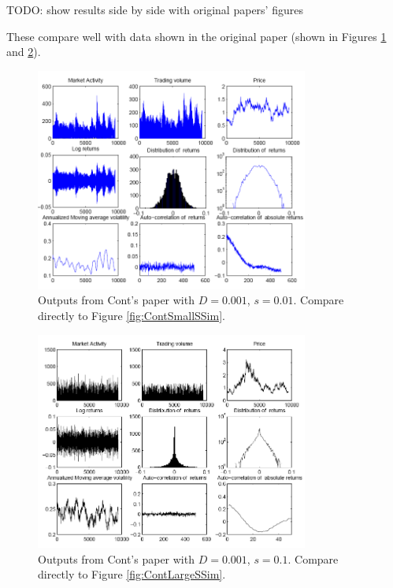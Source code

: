 \documentclass[runningheads]{llncs}
\begin{document}
TODO: show results side by side with original papers' figures

These compare well with data shown in the original paper (shown in Figures \ref{fig:ContSmallSPap} and \ref{fig:ContLargeSPap}).


\begin{figure}[htbp]
  \begin{center}
    \includegraphics[width=0.8\textwidth]{../graphics/Cont-Fig3.png}
    \caption{Outputs from Cont's paper with $D=0.001$, $s=0.01$. Compare directly to Figure \ref{fig:ContSmallSSim}.}
    \label{fig:ContSmallSPap}
  \end{center}
\end{figure}

\begin{figure}[htbp]
  \begin{center}
    \includegraphics[width=0.8\textwidth]{../graphics/Cont-Fig4.png}
    \caption{Outputs from Cont's paper with $D=0.001$, $s=0.1$. Compare directly to Figure \ref{fig:ContLargeSSim}.}
    \label{fig:ContLargeSPap}
  \end{center}
\end{figure}
\end{document}
